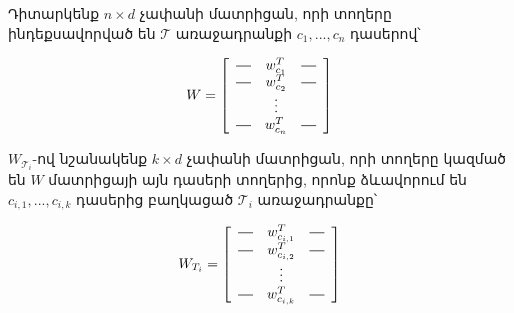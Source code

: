 \documentclass[12pt]{article}
\newcommand*{\horzbar}{\rule[.5ex]{2.5ex}{0.5pt}}
\begin{document}
 Դիտարկենք $n\times  d$  չափանի մատրիցան, որի տողերը ինդեքսավորված են $\mathcal{T}$ առաջադրանքի $c_1, ..., c_n$ դասերով՝ 

$$W = \left[
  \begin{array}{ccc}
    \horzbar & w^{T}_{c_1} & \horzbar \\
    \horzbar & w^{T}_{c_2} & \horzbar \\
             & \vdots    &          \\
    \horzbar & w^{T}_{c_{n}} & \horzbar
  \end{array}
\right]$$


$W_{\mathcal{T}_i}$-ով նշանակենք $k \times d$ չափանի մատրիցան, որի տողերը կազմած են $W$ մատրիցայի այն դասերի տողերից, որոնք ձևավորում են  $c_{i,1}, ..., c_{i,k}$ դասերից բաղկացած $\mathcal{T}_i$ առաջադրանքը՝

$$W_{T_i} = \left[
  \begin{array}{ccc}
    \horzbar & w^{T}_{c_{i,1}} & \horzbar \\
    \horzbar & w^{T}_{c_{i, 2}} & \horzbar \\
             & \vdots    &          \\
    \horzbar & w^{T}_{c_{{i, k}}} & \horzbar
  \end{array}
\right]$$
\end{document}
